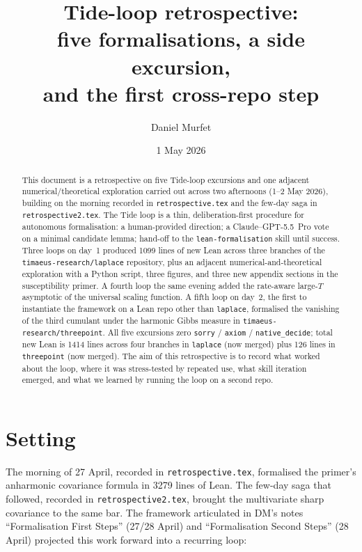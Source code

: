 \documentclass[11pt]{article}
\title{Tide-loop retrospective:\\five formalisations, a side excursion,\\
and the first cross-repo step}
\author{Daniel Murfet}
\date{1 May 2026}
\begin{document}
\maketitle

\begin{abstract}
This document is a retrospective on five Tide-loop excursions and one
adjacent numerical/theoretical exploration carried out across two
afternoons (1--2 May 2026), building on the morning recorded in
\texttt{retrospective.tex} and the few-day saga in
\texttt{retrospective2.tex}. The Tide loop is a thin, deliberation-first
procedure for autonomous formalisation: a human-provided direction;
a Claude--GPT-5.5~Pro vote on a minimal candidate lemma; hand-off to the
\texttt{lean-formalisation} skill until success. Three loops on day~1
produced 1099 lines of new Lean across three branches of the
\texttt{timaeus-research/laplace} repository, plus an adjacent
numerical-and-theoretical exploration with a Python script, three
figures, and three new appendix sections in the susceptibility primer.
A fourth loop the same evening added the rate-aware large-$T$
asymptotic of the universal scaling function. A fifth loop on day~2,
the first to instantiate the framework on a Lean repo other than
\texttt{laplace}, formalised the vanishing of the third cumulant under
the harmonic Gibbs measure in \texttt{timaeus-research/threepoint}.
All five excursions zero \texttt{sorry} / \texttt{axiom} /
\texttt{native\_decide}; total new Lean is 1414 lines across four
branches in \texttt{laplace} (now merged) plus 126 lines in
\texttt{threepoint} (now merged). The aim of this retrospective is to
record what worked about the loop, where it was stress-tested by
repeated use, what skill iteration emerged, and what we learned by
running the loop on a second repo.
\end{abstract}

\tableofcontents

\section{Setting}

The morning of 27 April, recorded in \texttt{retrospective.tex},
formalised the primer's anharmonic covariance formula in 3279 lines of
Lean. The few-day saga that followed, recorded in
\texttt{retrospective2.tex}, brought the multivariate sharp covariance
to the same bar. The framework articulated in DM's notes
``Formalisation First Steps'' (27/28 April) and ``Formalisation Second
Steps'' (28 April) projected this work forward into a recurring loop:
\end{document}
